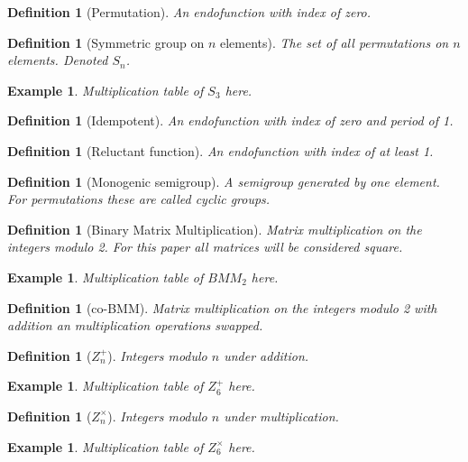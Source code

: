 \documentclass{article}
\newtheorem{defn}[thm]{Definition}
\newtheorem{exam}[thm]{Example}
\begin{document}
\begin{defn}[Permutation] An endofunction with index of zero.\end{defn}

\begin{defn}[Symmetric group on $n$ elements] The set of all permutations on $n$ elements. Denoted $S_{n}$.\end{defn}
\begin{exam} Multiplication table of $S_{3}$ here.\end{exam}
\begin{defn}[Idempotent] An endofunction with index of zero and period of 1.\end{defn}

\begin{defn}[Reluctant function] An endofunction with index of at least 1.\end{defn}
\begin{defn}[Monogenic semigroup] A semigroup generated by one element. For permutations these are called cyclic groups.\end{defn}

\begin{defn}[Binary Matrix Multiplication] Matrix multiplication on the integers modulo 2. For this paper all matrices will be considered square.\end{defn}

\begin{exam} Multiplication table of $BMM_{2}$ here.\end{exam}

\begin{defn}[co-BMM] Matrix multiplication on the integers modulo 2 with addition an multiplication operations swapped.\end{defn}

\begin{defn}[$Z^{+}_{n}$] Integers modulo $n$ under addition. \end{defn} 

\begin{exam} Multiplication table of $Z^{+}_{6}$ here.\end{exam}

\begin{defn}[$Z^{\times}_{n}$] Integers modulo $n$ under multiplication. \end{defn} 

\begin{exam} Multiplication table of $Z^{\times}_{6}$ here.\end{exam}
\end{document}

